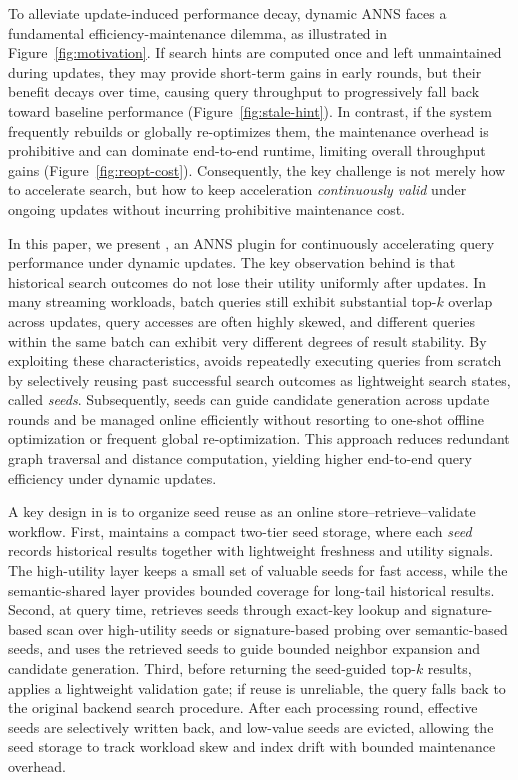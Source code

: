 To alleviate update-induced performance decay, dynamic ANNS faces a fundamental efficiency-maintenance dilemma, as illustrated in Figure~\ref{fig:motivation}. If search hints are computed once and left 
unmaintained during updates, they may provide short-term gains in early rounds, but their benefit decays over time, causing query throughput to progressively fall back toward baseline performance (Figure~\ref{fig:stale-hint}). In contrast, if the system frequently 
rebuilds or globally re-optimizes them, the maintenance overhead is prohibitive and can dominate end-to-end runtime, limiting overall throughput gains (Figure~\ref{fig:reopt-cost}). Consequently, the key challenge is not merely how 
to accelerate search, but how to keep acceleration \emph{continuously valid} under ongoing updates without incurring prohibitive maintenance cost.


In this paper, we present \system, an ANNS plugin for continuously accelerating query performance under dynamic updates. The key observation behind \system is that historical search outcomes do not lose their utility uniformly after updates. In many streaming workloads, batch queries still exhibit substantial top-$k$ overlap across updates, query accesses are often highly skewed, and different queries within the same batch can exhibit very different degrees of result stability. By exploiting these characteristics, \system avoids repeatedly executing queries from scratch by selectively reusing past successful search outcomes as lightweight search states, called \textit{seeds}. Subsequently, seeds can guide candidate generation across update rounds and be managed online efficiently without resorting to one-shot offline optimization or frequent global re-optimization.
This approach reduces redundant graph traversal and distance computation, yielding higher end-to-end query efficiency under dynamic updates.

A key design in \system is to organize seed reuse as an online store--retrieve--validate workflow.
First, \system maintains a compact two-tier seed storage, where each \textit{seed} records historical results together with lightweight freshness and utility signals.
The high-utility layer keeps a small set of valuable seeds for fast access, while the semantic-shared layer provides bounded coverage for long-tail historical results.
Second, at query time, \system retrieves seeds through exact-key lookup and signature-based scan over high-utility seeds or signature-based probing over semantic-based seeds, and uses the retrieved seeds to guide bounded neighbor expansion and candidate generation. Third, before returning the seed-guided top-$k$ results, \system applies a lightweight validation gate; if reuse is unreliable, the query falls back to the original backend search procedure.
After each processing round, effective seeds are selectively written back, and low-value seeds are evicted, allowing the seed storage to track workload skew and index drift with bounded maintenance overhead.

